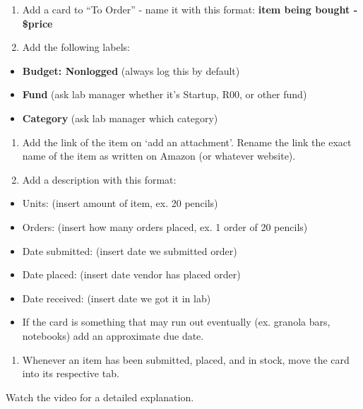 \documentclass[]{book}
\providecommand{\tightlist}{%
  \setlength{\itemsep}{0pt}\setlength{\parskip}{0pt}}
\begin{document}
\begin{enumerate}
\def\labelenumi{\arabic{enumi}.}
\setcounter{enumi}{1}
\item
  Add a card to ``To Order'' - name it with this format: \textbf{item being bought - \$price}
\item
  Add the following labels:
\end{enumerate}

\begin{itemize}
\tightlist
\item
  \textbf{Budget: Nonlogged} (always log this by default)
\item
  \textbf{Fund} (ask lab manager whether it's Startup, R00, or other fund)
\item
  \textbf{Category} (ask lab manager which category)
\end{itemize}

\begin{enumerate}
\def\labelenumi{\arabic{enumi}.}
\setcounter{enumi}{3}
\item
  Add the link of the item on `add an attachment'. Rename the link the exact name of the item as written on Amazon (or whatever website).
\item
  Add a description with this format:
\end{enumerate}

\begin{itemize}
\tightlist
\item
  Units: (insert amount of item, ex. 20 pencils)
\item
  Orders: (insert how many orders placed, ex. 1 order of 20 pencils)
\item
  Date submitted: (insert date we submitted order)
\item
  Date placed: (insert date vendor has placed order)
\item
  Date received: (insert date we got it in lab)
\item
  If the card is something that may run out eventually (ex. granola bars, notebooks) add an approximate due date.
\end{itemize}

\begin{enumerate}
\def\labelenumi{\arabic{enumi}.}
\setcounter{enumi}{5}
\tightlist
\item
  Whenever an item has been submitted, placed, and in stock, move the card into its respective tab.
\end{enumerate}

Watch the video for a detailed explanation.
\end{document}
